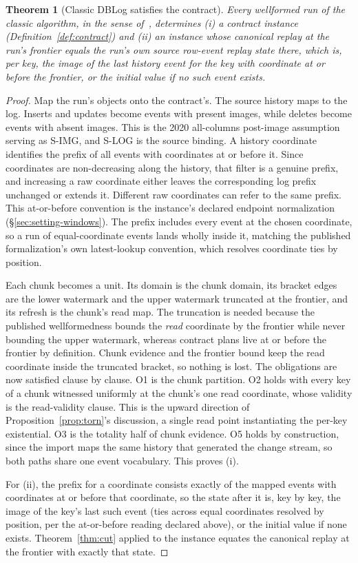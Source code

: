 \documentclass[sigconf,nonacm,10pt]{acmart}
\theoremstyle{plain}
\newtheorem{theorem}{Theorem}
\theoremstyle{definition}
\begin{document}
\begin{theorem}[Classic DBLog satisfies the contract]\label{thm:classic}
Every wellformed run of the classic algorithm, in the sense
of~\cite{andreakis2026virtualcuts}, determines (i) a contract
instance (Definition~\ref{def:contract}) and (ii) an instance whose
canonical replay at the run's frontier equals the run's own source
row-event replay state there, which is, per key, the image of the last 
history event for the key with coordinate at or before the frontier, 
or the initial value if no such event exists.
\end{theorem}

\begin{proof}
Map the run's objects onto the contract's. The source history maps
to the log. Inserts and updates become events with present images,
while deletes become events with absent images. This is the 2020
all-columns post-image assumption serving as S-IMG, and S-LOG is
the source binding. A history coordinate identifies the prefix of all
events with coordinates at or before it. Since coordinates are
non-decreasing along the history, that filter is a genuine prefix,
and increasing a raw coordinate either leaves the corresponding log 
prefix unchanged or extends it. Different raw coordinates can refer 
to the same prefix.
This at-or-before convention is the instance's declared endpoint
normalization (\S\ref{sec:setting-windows}). The prefix includes every event
at the chosen coordinate, so a run of equal-coordinate events
lands wholly inside it, matching the published formalization's own
latest-lookup convention, which resolves coordinate ties by
position.

Each chunk becomes a unit. Its domain is the chunk domain, its
bracket edges are the lower watermark and the upper watermark
truncated at the frontier, and its refresh is the chunk's read
map. The truncation is needed because the published wellformedness
bounds the \emph{read} coordinate by the frontier while
never bounding the upper watermark, whereas contract
plans live at or before the frontier by definition. Chunk evidence
and the frontier bound keep the read coordinate inside the
truncated bracket, so nothing is lost. The obligations are now
satisfied clause by clause. O1 is the chunk partition. O2 holds
with every key of a chunk witnessed uniformly at the chunk's one
read coordinate, whose validity is the read-validity clause. This is the upward
direction of Proposition~\ref{prop:torn}'s discussion, a single
read point instantiating the per-key existential. O3 is the
totality half of chunk evidence. O5 holds by construction, since
the import maps the same history that generated the change stream,
so both paths share one event vocabulary. This proves (i).

For (ii), the prefix for a coordinate consists exactly of the mapped
events with coordinates at or before that coordinate, so the
state after it is, key by key, the image of the key's last such
event (ties across equal coordinates resolved by position, per
the at-or-before reading declared above), or the initial value if
none exists. Theorem~\ref{thm:cut}
applied to the instance equates the canonical replay at the
frontier with exactly that state.
\end{proof}
\end{document}
